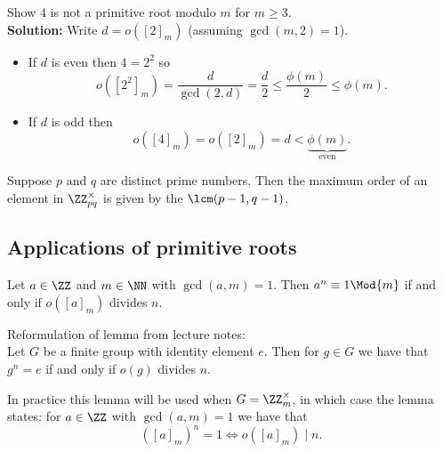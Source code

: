 \documentclass[12pt, a4paper]{article}
\begin{document}
\begin{example}
    Show \(4\) is not a primitive root modulo \(m\) for \(m\geq 3\). \\ 
    \textbf{Solution:} Write \(d=o([2]_m)\) (assuming \(\gcd(m,2)=1\)).
    \begin{itemize}
        \item If \(d\) is even then \(4=2^2\) so 
        \[o([2^2]_m)=\frac{d}{\gcd(2,d)}=\frac{d}{2} \leq \frac{\phi(m)}{2} \leq \phi(m).\]
        \item If \(d\) is odd then
        \[o([4]_m)=o([2]_m)=d < \underbrace{\phi(m)}_{\text{even}}.\]
    \end{itemize}
\end{example}

\begin{mdprop}
    Suppose \(p\) and \(q\) are distinct prime numbers. Then the maximum order of an element in \(\ZZ_{pq}^{\times}\) is given by the \(\lcm(p-1,q-1)\).
\end{mdprop}

\subsection{Applications of primitive roots}

\begin{mdlemma}
    Let \(a \in \ZZ\) and \(m \in \NN\) with \(\gcd(a,m)=1\). Then \(a^n \equiv 1 \Mod{m}\) if and only if \(o([a]_m)\) divides \(n\).
\end{mdlemma}

\begin{mdremark}
    Reformulation of lemma from lecture notes: \\
    Let \(G\) be a finite group with identity element \(e\). Then for \(g\in G\) we have that \(g^n =e\) if and only if \(o(g)\) divides \(n\).
\end{mdremark}

\begin{mdnote}
    In practice this lemma will be used when \(G=\ZZ_m^{\times}\), in which case the lemma states: for \(a\in \ZZ\) with \(\gcd(a,m)=1\) we have that 
    \[([a]_m)^n =1 \iff o([a]_m) \mid n.\]
\end{mdnote}
\end{document}
